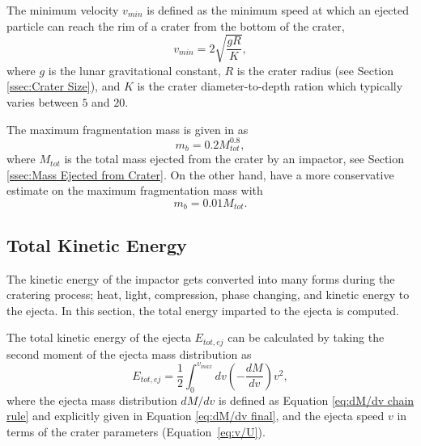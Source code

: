 \documentclass{article}
\begin{document}
The minimum velocity $v_{min}$ is defined as the minimum speed at which an ejected particle can reach the rim of a crater from the bottom of the crater,
\begin{equation}
v_{min} = 2\sqrt{\frac{gR}{K}},
\end{equation}
where $g$ is the lunar gravitational constant, $R$ is the crater radius (see Section \ref{ssec:Crater Size}), and $K$ is the crater diameter-to-depth ration which typically varies between $5$ and $20$. 

The maximum fragmentation mass is given in \cite{oKeefe1985impact} as
\begin{equation}
m_b = 0.2 M_{tot}^{0.8},
\end{equation}
where $M_{tot}$ is the total mass ejected from the crater by an impactor, see Section \ref{ssec:Mass Ejected from Crater}. On the other hand, \cite{koschny2001impacts_mass} have a more conservative estimate on the maximum fragmentation mass with
\begin{equation}
m_b = 0.01 M_{tot}.
\end{equation}

\subsection{Total Kinetic Energy}\label{ssec:Total Kinetic Energy}

The kinetic energy of the impactor gets converted into many forms during the cratering process; heat, light, compression, phase changing, and kinetic energy to the ejecta. In this section, the total energy imparted to the ejecta is computed.

The total kinetic energy of the ejecta $E_{tot,ej}$ can be calculated by taking the second moment of the ejecta mass distribution as
\begin{equation}
E_{tot,ej} = \frac{1}{2}\int_{0}^{v_{max}}dv \left(-\frac{dM}{dv}\right)v^2,
\end{equation}
where the ejecta mass distribution $dM/dv$ is defined as Equation \eqref{eq:dM/dv chain rule} and explicitly given in Equation \eqref{eq:dM/dv final}, and the ejecta speed $v$ in terms of the crater parameters (Equation~\eqref{eq:v/U}).
\end{document}
